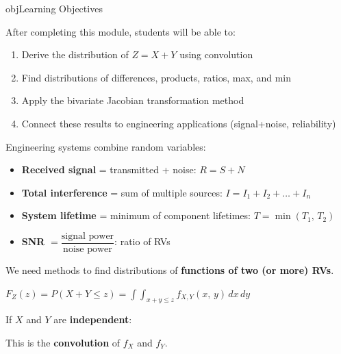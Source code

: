 \begin{PSbox}[unbreakable]{obj}{Learning Objectives}

After completing this module, students will be able to:

\begin{enumerate}
\def\labelenumi{\arabic{enumi}.}
\tightlist
\item
  Derive the distribution of $Z = X + Y$ using convolution
\item
  Find distributions of differences, products, ratios, max, and min
\item
  Apply the bivariate Jacobian transformation method
\item
  Connect these results to engineering applications (signal+noise, reliability)
\end{enumerate}

\end{PSbox}


Engineering systems combine random variables:

\begin{itemize}
\tightlist
\item
  \textbf{Received signal} = transmitted + noise: $R = S + N$
\item
  \textbf{Total interference} = sum of multiple sources: $I = I_{1} + I_{2} + \ldots + I_{n}$
\item
  \textbf{System lifetime} = minimum of component lifetimes: $T = \min (T_{1},\, T_{2})$
\item
  \textbf{SNR} $= \dfrac{\text{signal power}}{\text{noise power}}$: ratio of RVs
\end{itemize}

We need methods to find distributions of \textbf{functions of two (or more) RVs}.



$F_{Z}(z) = P(X + Y \le z) = \int \int_{x+y \le z} f_{X,Y}(x,\,y)\,dx\,dy$


If $X$ and $Y$ are \textbf{independent}:


This is the \textbf{convolution} of $f_{X}$ and $f_{Y}$.

